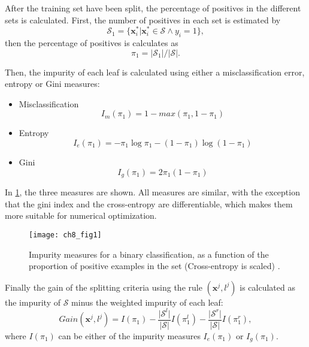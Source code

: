 After the training set have been split, the percentage of positives in the different sets is 
calculated. First, the number of positives in each set is estimated by
\begin{equation}
 \mathcal{S}_1 = \{\mathbf{x}_i^* \vert \mathbf{x}_i^* \in \mathcal{S} \wedge y_i =1 \},
\end{equation}
then the percentage of positives is calculates as
\begin{equation}
 \pi_1=\vert \mathcal{S}_1 \vert / \vert \mathcal{S} \vert.
\end{equation}

Then, the impurity of each leaf is calculated using either a misclassification error, 
entropy or Gini measures:
\begin{itemize}
 \item  Misclassification
 \begin{equation}
 I_m(\pi_1)=1-max(\pi_1,1-\pi_1)
 \end{equation}
 
 \item Entropy
 \begin{equation}
 I_e(\pi_1)=-\pi_1\log \pi_1 -(1-\pi_1) \log (1-\pi_1)
 \end{equation}
 
 \item Gini
 \begin{equation}
 I_g(\pi_1)=2\pi_1(1-\pi_1)
 \end{equation}
\end{itemize}

In \figurename{ \ref{fig:8:impurity}}, the three measures are shown. All measures are similar, with 
the exception that the gini index and the cross-entropy are differentiable, which makes them
more suitable for numerical optimization.
\begin{figure}[t!]
\texttt{[image: ch8\_fig1]}
\caption{Impurity measures for a binary classification, as a function of the proportion of
positive examples in the set (Cross-entropy is scaled) \citep{Hastie2009}.}
\label{fig:8:impurity}
\end{figure} 

Finally the gain of the splitting criteria using the rule $(\mathbf{x}^j,l^j)$ is calculated as the 
impurity of $\mathcal{S}$ minus the weighted impurity of each leaf:
\begin{equation}\label{eq:8:gain}
  Gain(\mathbf{x}^j,l^j)=I(\pi_1)-\frac{\vert \mathcal{S}^l \vert}{\vert \mathcal{S} 
\vert}I(\pi^l_1)  -\frac{\vert \mathcal{S}^r \vert}{\vert \mathcal{S} \vert}I(\pi^r_1),
\end{equation} 
where $I(\pi_1)$ can be either of the impurity measures $I_e(\pi_1)$ or $I_g(\pi_1)$.

